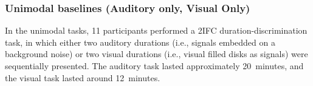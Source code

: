 \documentclass{jov}
\begin{document}

\subsubsection{Unimodal baselines (Auditory only, Visual Only)}
In the unimodal tasks, 11 participants performed a 2IFC duration-discrimination task, in which either two auditory durations (i.e., signals embedded on a background noise) or two visual durations (i.e., visual filled disks as signals) were sequentially presented. The auditory task lasted approximately 20~minutes, and the visual task lasted around 12~minutes. 
\end{document}
